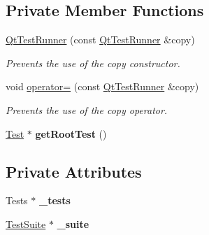 \subsection*{Private Member Functions}
\begin{DoxyCompactItemize}
\item 
\hyperlink{class_qt_test_runner_a73637b3e4e5ee5b0f9a9f1bced8cb1a6}{Qt\+Test\+Runner} (const \hyperlink{class_qt_test_runner}{Qt\+Test\+Runner} \&copy)\hypertarget{class_qt_test_runner_a73637b3e4e5ee5b0f9a9f1bced8cb1a6}{}\label{class_qt_test_runner_a73637b3e4e5ee5b0f9a9f1bced8cb1a6}

\begin{DoxyCompactList}\small\item\em Prevents the use of the copy constructor. \end{DoxyCompactList}\item 
void \hyperlink{class_qt_test_runner_afd642eb5068c5c7f5273bb3aac69b5e5}{operator=} (const \hyperlink{class_qt_test_runner}{Qt\+Test\+Runner} \&copy)\hypertarget{class_qt_test_runner_afd642eb5068c5c7f5273bb3aac69b5e5}{}\label{class_qt_test_runner_afd642eb5068c5c7f5273bb3aac69b5e5}

\begin{DoxyCompactList}\small\item\em Prevents the use of the copy operator. \end{DoxyCompactList}\item 
\hyperlink{class_test}{Test} $\ast$ {\bfseries get\+Root\+Test} ()\hypertarget{class_qt_test_runner_a50536248c3d114cd0c486cc9912447ad}{}\label{class_qt_test_runner_a50536248c3d114cd0c486cc9912447ad}

\end{DoxyCompactItemize}
\subsection*{Private Attributes}
\begin{DoxyCompactItemize}
\item 
Tests $\ast$ {\bfseries \+\_\+tests}\hypertarget{class_qt_test_runner_ae95af36c334c7b98513c3fa8551e6af0}{}\label{class_qt_test_runner_ae95af36c334c7b98513c3fa8551e6af0}

\item 
\hyperlink{class_test_suite}{Test\+Suite} $\ast$ {\bfseries \+\_\+suite}\hypertarget{class_qt_test_runner_a3aa2a6606158c51ce211e37a4cc968b6}{}\label{class_qt_test_runner_a3aa2a6606158c51ce211e37a4cc968b6}

\end{DoxyCompactItemize}


